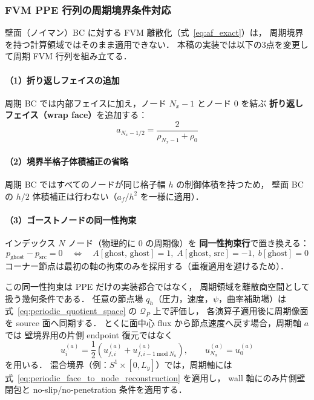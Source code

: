 \subsubsection{FVM PPE 行列の周期境界条件対応}
\label{sec:fvm_periodic}

壁面（ノイマン）BC に対する FVM 離散化（式~\eqref{eq:af_exact}）は，
周期境界を持つ計算領域ではそのまま適用できない．
本稿の実装では以下の3点を変更して周期 FVM 行列を組み立てる．

\paragraph{（1）折り返しフェイスの追加}
周期 BC では内部フェイスに加え，ノード $N_x-1$ とノード $0$ を結ぶ
\textbf{折り返しフェイス（wrap face）}を追加する：
\begin{equation}
  a_{N_x - 1/2} = \frac{2}{\rho_{N_x-1} + \rho_0}
  \label{eq:af_wrap}
\end{equation}

\paragraph{（2）境界半格子体積補正の省略}
周期 BC ではすべてのノードが同じ格子幅 $h$ の制御体積を持つため，
壁面 BC の $h/2$ 体積補正は行わない（$a_f / h^2$ を一様に適用）．

\paragraph{（3）ゴーストノードの同一性拘束}
インデックス $N$ ノード（物理的に $0$ の周期像）を
\textbf{同一性拘束行}で置き換える：
\begin{equation}
  p_{\mathrm{ghost}} - p_{\mathrm{src}} = 0
  \quad\Longleftrightarrow\quad
  A[\mathrm{ghost},\,\mathrm{ghost}] = 1,\;
  A[\mathrm{ghost},\,\mathrm{src}]   = -1,\;
  b[\mathrm{ghost}] = 0
  \label{eq:ghost_identity}
\end{equation}
コーナー節点は最初の軸の拘束のみを採用する（重複適用を避けるため）．

この同一性拘束は PPE だけの実装都合ではなく，
周期領域を離散商空間として扱う幾何条件である．
任意の節点場 $q_h$（圧力，速度，$\psi$，曲率補助場）は
式~\eqref{eq:periodic_quotient_space} の $\mathcal{Q}_P$ 上で評価し，
各演算子適用後に周期像面を source 面へ同期する．
とくに面中心 flux から節点速度へ戻す場合，周期軸 $a$ では
壁境界用の片側 endpoint 復元ではなく
\begin{equation}
  u_{i}^{(a)}
  =
  \frac{1}{2}
  \left(
    u_{f,i}^{(a)}
    +
    u_{f,i-1\ \mathrm{mod}\ N_a}^{(a)}
  \right),
  \qquad
  u_{N_a}^{(a)}=u_{0}^{(a)}
  \label{eq:periodic_face_to_node_reconstruction}
\end{equation}
を用いる．
混合境界（例：$S^1\times[0,L_y]$）では，周期軸には
式~\eqref{eq:periodic_face_to_node_reconstruction} を適用し，
wall 軸にのみ片側壁閉包と no-slip/no-penetration 条件を適用する．

